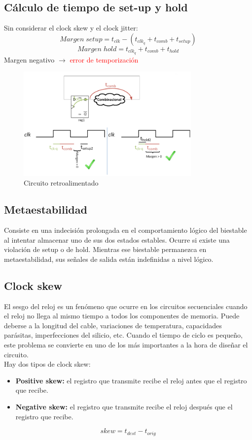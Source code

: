 \subsection{Cálculo de tiempo de set-up y hold}
Sin considerar el clock skew y el clock jitter:
\[
	Margen\; setup = t_{clk}- \left(t_{clk_q} +t_{comb} + t_{setup}\right)
\]
\[
	Margen \; hold = t_{clk_q} + t_{comb} + t_{hold}
\]
Margen negativo $\rightarrow$ \textcolor{red}{error de temporización}
\begin{figure}[H]
	\centering
	\includegraphics[width=0.8\textwidth]{images/Tema_2/Circ_retroalimentado.PNG}
	\caption{Circuito retroalimentado}
\end{figure}

\subsection{Metaestabilidad}
Consiste en una indecisión prolongada en el comportamiento lógico del  biestable al intentar almacenar uno de sus dos estados estables.
Ocurre si existe una violación de setup o de hold. Mientras ese biestable permanezca en metaestabilidad, sus señales de salida están indefinidas a nivel lógico.
\subsection{Clock skew}
El sesgo del reloj es un fenómeno que ocurre en los circuitos secuenciales cuando el reloj no llega al mismo tiempo a todos los componentes de memoria. Puede deberse a la longitud del cable, variaciones de temperatura, capacidades parásitas, imperfecciones del silicio, etc.
Cuando el tiempo de ciclo es pequeño, este problema se convierte en uno de los más importantes a la hora de diseñar el circuito.\\
Hay dos tipos de clock skew:
\begin{itemize}
	\item\textbf{Positive skew:} el registro que transmite recibe el reloj antes que el registro que recibe.
	\item\textbf{Negative skew:} el registro que transmite recibe el reloj después que el registro que recibe.
\end{itemize}
\[
	skew=t_{dest}-t_{orig}
\]

